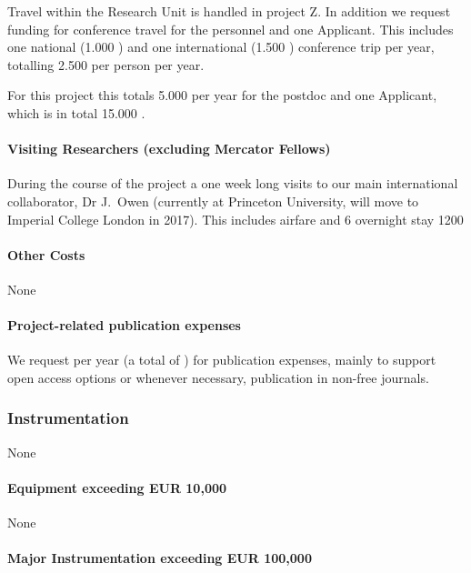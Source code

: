 \documentclass[10pt,fleqn,twoside]{article}
\begin{document}
Travel within the Research Unit is handled in project Z. In addition we
request funding for conference travel for the personnel and one Applicant.
This includes one national (1.000 \EUR{}) and one international (1.500 \EUR{})
conference trip per year, totalling 2.500 \EUR{} per person per year. 

For this project this totals 5.000 \EUR{} per year for the postdoc
and one Applicant, which is in total 15.000 \EUR{}.



\paragraph{Visiting Researchers (excluding Mercator Fellows)}

During the course of the project a one week long visits to our main
international collaborator, Dr J.~Owen (currently at Princeton
University, will move to Imperial College London in 2017).
This includes airfare and 6 overnight stay 1200 \EUR{}

\paragraph{Other Costs}

None

\paragraph{Project-related publication expenses}

We request  per year (a total of ) for publication
expenses, mainly to support open access options or whenever necessary,
publication in non-free journals.

\subsubsection{Instrumentation}

None 

\paragraph{Equipment exceeding EUR 10,000} 

None

\paragraph{Major Instrumentation exceeding EUR 100,000} 
\end{document}
